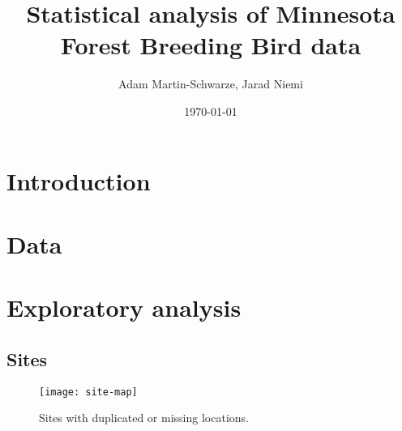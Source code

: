\documentclass{article}
\title{Statistical analysis of Minnesota Forest Breeding Bird data}
\author{Adam Martin-Schwarze, Jarad Niemi}
\date{\today}
\begin{document}
\maketitle
\tableofcontents
\newpage


\section{Introduction}



\section{Data} 



\section{Exploratory analysis}

\subsection{Sites}






\begin{figure}
\texttt{[image: site-map]}
\caption{Sites with duplicated or missing locations.}
\label{fig:site-map}
\end{figure}
\end{document}
